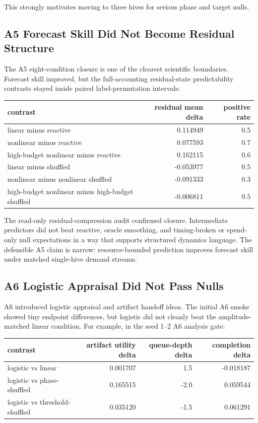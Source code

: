 \documentclass[11pt]{article}
\begin{document}
This strongly motivates moving to three hives for serious phase and target
nulls.

\subsection{A5 Forecast Skill Did Not Become Residual Structure}

The A5 eight-condition closure is one of the clearest scientific boundaries.
Forecast skill improved, but the full-accounting residual-state predictability
contrasts stayed inside paired label-permutation intervals:

\begin{center}
\begin{tabular}{lrr}
contrast & residual mean delta & positive rate \\
\hline
linear minus reactive & 0.114949 & 0.5 \\
nonlinear minus reactive & 0.077593 & 0.7 \\
high-budget nonlinear minus reactive & 0.162115 & 0.6 \\
linear minus shuffled & -0.053977 & 0.5 \\
nonlinear minus nonlinear shuffled & -0.091333 & 0.3 \\
high-budget nonlinear minus high-budget shuffled & -0.006811 & 0.5 \\
\end{tabular}
\end{center}

The read-only residual-compression audit confirmed closure. Intermediate
predictors did not beat reactive, oracle smoothing, and timing-broken or
spend-only null expectations in a way that supports structured dynamics
language. The defensible A5 claim is narrow: resource-bounded prediction
improves forecast skill under matched single-hive demand streams.

\subsection{A6 Logistic Appraisal Did Not Pass Nulls}

A6 introduced logistic appraisal and artifact handoff ideas. The initial A6
smoke showed tiny endpoint differences, but logistic did not cleanly beat the
amplitude-matched linear condition. For example, in the seed 1--2 A6 analysis
gate:

\begin{center}
\begin{tabular}{lrrr}
contrast & artifact utility delta & queue-depth delta & completion delta \\
\hline
logistic vs linear & 0.001707 & 1.5 & -0.018187 \\
logistic vs phase-shuffled & 0.165515 & -2.0 & 0.059544 \\
logistic vs threshold-shuffled & 0.035120 & -1.5 & 0.061291 \\
\end{tabular}
\end{center}
\end{document}
